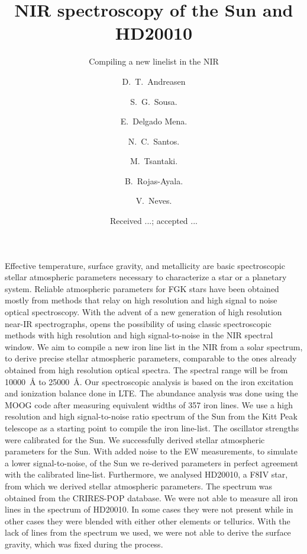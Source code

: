 \documentclass{aa}
\begin{document}
\title{NIR spectroscopy of the Sun and HD20010}
\subtitle{Compiling a new linelist in the NIR}


\author{ D.~T.~Andreasen
    \and S.~G.~Sousa.
    \and E.~Delgado Mena.
    \and N.~C.~Santos.
    \and M.~Tsantaki.
    \and B.~Rojas-Ayala.
    \and V.~Neves.}







\date{Received ...; accepted ...}

\abstract
{Effective temperature, surface gravity, and metallicity are basic
spectroscopic stellar atmospheric parameters necessary to characterize
a star or a planetary system. Reliable atmospheric parameters for
FGK stars have been obtained mostly from methods that relay on high
resolution and high signal to noise optical spectroscopy. With the
advent of a new generation of high resolution near-IR spectrographs,
opens the possibility of using classic spectroscopic methods with
high resolution and high signal-to-noise in the NIR spectral window.}
{We aim to compile a new iron line list in the NIR from a solar
spectrum, to derive precise stellar atmospheric parameters,
comparable to the ones already obtained from high resolution optical
spectra. The spectral range will be from \SI{10000}{\angstrom} to
\SI{25000}{\angstrom}.}
{Our spectroscopic analysis is based on the iron excitation and
ionization balance done in LTE. The abundance analysis was done using
the MOOG code after measuring equivalent widths of 357 iron lines. We
use a high resolution and high signal-to-noise ratio spectrum of the Sun
from the Kitt Peak telescope as a starting point to compile the iron
line-list. The oscillator strengths were calibrated for the Sun.}
{We successfully derived stellar atmospheric parameters for the
Sun. With added noise to the EW measurements, to simulate a lower
signal-to-noise, of the Sun we re-derived parameters in perfect
agreement with the calibrated line-list. Furthermore, we analysed
HD20010, a F8IV star, from which we derived stellar atmospheric
parameters. The spectrum was obtained from the CRIRES-POP database. We
were not able to measure all iron lines in the spectrum of HD20010. In
some cases they were not present while in other cases they were blended
with either other elements or tellurics. With the lack of 
lines from the spectrum we used, we were not able to derive the surface
gravity, which was fixed during the process.}
{}
\end{document}
